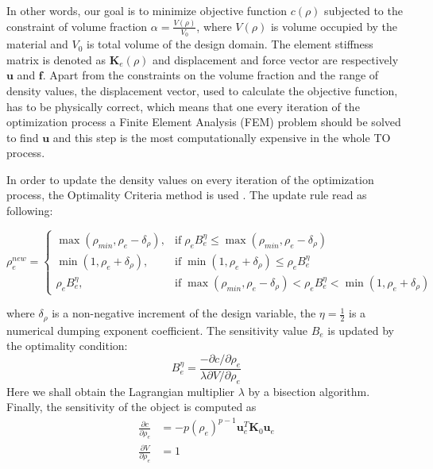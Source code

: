 In other words, our goal is to minimize objective function $c(\rho)$ subjected to the constraint of volume fraction $\alpha = \frac{V(\rho)}{V_{0}}$, where $V(\rho)$ is volume occupied by the material and $ V_{0} $ is total volume of the design domain.
The element stiffness matrix is denoted as $\mathbf{K}_{e}(\rho)$ and displacement and force vector are respectively $\mathbf{u}$ and $\mathbf{f}$.
Apart from the constraints on the volume fraction and the range of density values, the displacement vector, used to calculate the objective function, has to be physically correct, which means that one every iteration of the optimization process a Finite Element Analysis (FEM) problem should be solved to find $\mathbf{u}$ and this step is the most computationally expensive in the whole TO process.
\medskip

In order to update the density values on every iteration of the optimization process, the Optimality Criteria method is used \cite{to_simp, to_99line}.
The update rule read as following:

\begin{equation}
\rho^{new}_{e} = 
\begin{cases}
 \max(\rho_{min},\rho_{e}-\delta_{\rho}) , & \mathrm{if} \; \rho_{e}B^{\eta}_{e} \leq \max(\rho_{min},\rho_{e}-\delta_{\rho}) \\
 \min(1,\rho_{e}+\delta_{\rho}), & \mathrm{if} \; \min(1,\rho_{e}+\delta_{\rho}) \leq \rho_{e}B^{\eta}_{e}\\
 \rho_{e}B^{\eta}_{e},  & \mathrm{if} \; \max(\rho_{min},\rho_{e}-\delta_{\rho}) < \rho_{e}B^{\eta}_{e} < \min(1,\rho_{e}+\delta_{\rho}) 
\end{cases}
\end{equation}

where $\delta_{\rho}$ is a non-negative increment of the design variable, the $\eta = \frac{1}{2} $ is a numerical dumping exponent coefficient.
The sensitivity value $B_{e}$ is updated by the optimality condition:
\begin{equation}
B^{\eta}_{e} = \frac{-\partial c / \partial \rho_{e}}{\lambda \partial V / \partial \rho_{e}}
\end{equation}
Here we shall obtain the Lagrangian multiplier $\lambda$ by a bisection algorithm.
Finally, the sensitivity of the object is computed as 
\begin{align*}
	\frac{\partial c}{\partial \rho_{e}} & = -p(\rho_{e})^{p-1} \mathbf{u}^{T}_{e} \mathbf{K}_{0} \mathbf{u}_{e}\\
	\frac{\partial V}{\partial \rho_{e}} & = 1
\end{align*}

